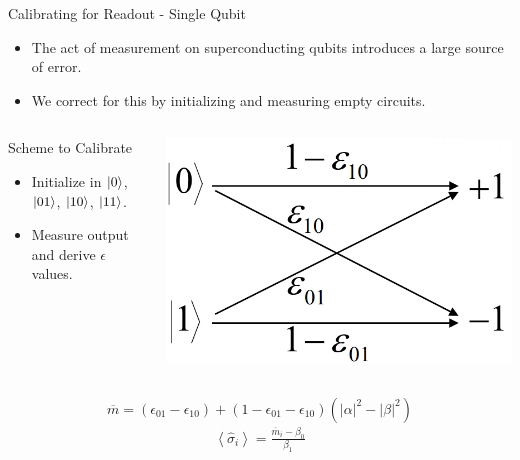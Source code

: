 \begin{frame}{Calibrating for Readout - Single Qubit}
  \begin{itemize}
    \item The act of measurement on superconducting qubits introduces a large
source of error.
    \item We correct for this by initializing and measuring empty circuits.
  \end{itemize}

\begin{columns}
  \begin{block}{Scheme to Calibrate}
    \begin{itemize}
    \item Initialize in $\ket{0}$, $\ket{01}$, $\ket{10}$, $\ket{11}$.
    \item Measure output and derive $\epsilon$ values.
    \end{itemize}
  \end{block}

  \includegraphics[width=\textwidth]{images/bit_flip_calibration.png}
\end{columns}

\begin{equation*}
  \overline{m}=\left(\epsilon_{01}-\epsilon_{10}\right)
  +\left(1-\epsilon_{01}-\epsilon_{10}\right)\left(\left|\alpha\right|^2
    -\left|\beta\right|^2\right)
\end{equation*}
\begin{equation}
  \begin{split}
    \left\langle \hat{\sigma}_i\right\rangle=
    \frac{\overline{m}_i-\beta_0}{\beta_1}
  \end{split}
\end{equation}
\end{frame}

